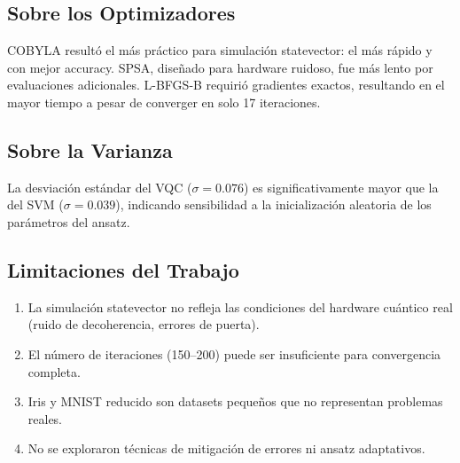 \subsection{Sobre los Optimizadores}

COBYLA result\'o el m\'as pr\'actico para simulaci\'on statevector: el m\'as r\'apido y con mejor accuracy. SPSA, dise\~nado para hardware ruidoso, fue m\'as lento por evaluaciones adicionales. L-BFGS-B requiri\'o gradientes exactos, resultando en el mayor tiempo a pesar de converger en solo 17 iteraciones.

\subsection{Sobre la Varianza}

La desviaci\'on est\'andar del VQC ($\sigma = 0.076$) es significativamente mayor que la del SVM ($\sigma = 0.039$), indicando sensibilidad a la inicializaci\'on aleatoria de los par\'ametros del ansatz.

\subsection{Limitaciones del Trabajo}

\begin{enumerate}
    \item La simulaci\'on statevector no refleja las condiciones del hardware cu\'antico real (ruido de decoherencia, errores de puerta).
    \item El n\'umero de iteraciones (150--200) puede ser insuficiente para convergencia completa.
    \item Iris y MNIST reducido son datasets peque\~nos que no representan problemas reales.
    \item No se exploraron t\'ecnicas de mitigaci\'on de errores ni ansatz adaptativos.
\end{enumerate}
